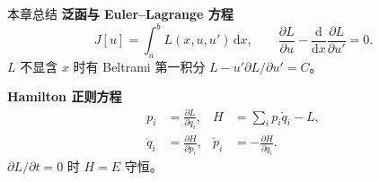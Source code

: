 \documentclass[fontset=windows, chinese, 10pt, xcolor=dvipsnames]{beamer}
\begin{document}
\begin{frame}{本章总结}
  \textbf{泛函与 Euler--Lagrange 方程}
  \begin{equation*}
    J[u]=\int_a^b L(x,u,u')\,\mathrm{d}x,
    \qquad
    \frac{\partial L}{\partial u}
    -\frac{\mathrm{d}}{\mathrm{d}x}\frac{\partial L}{\partial u'}=0.
  \end{equation*}
  $L$ 不显含 $x$ 时有 Beltrami 第一积分
  \(L-u'\partial L/\partial u'=C\)。
  \vspace{0.4em}
  
  \textbf{Hamilton 正则方程}
  \begin{align*}
    p_i&=\frac{\partial L}{\partial\dot q_i},
    &
    H&=\sum_i p_i\dot q_i-L,\\
    \dot q_i&=\frac{\partial H}{\partial p_i},
    &
    \dot p_i&=-\frac{\partial H}{\partial q_i}.
  \end{align*}
  $\partial L/\partial t=0$ 时 $H=E$ 守恒。
\end{frame}


\end{document}

